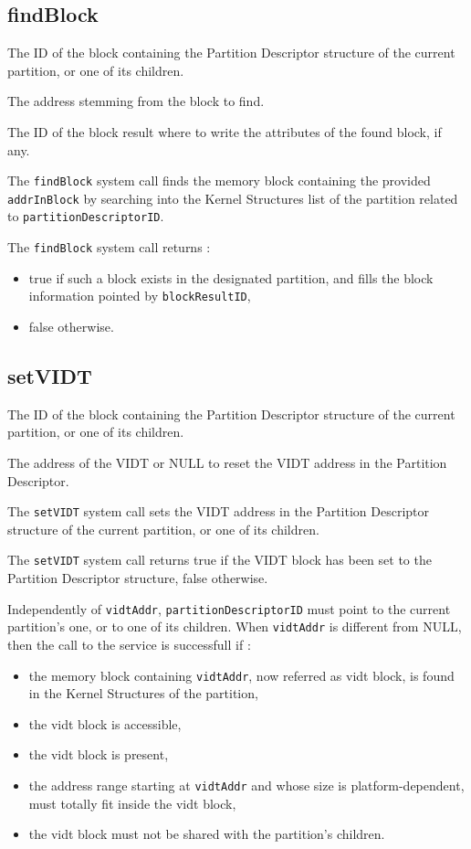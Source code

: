 \documentclass[10pt,a4paper,titlepage]{refart}
\begin{document}
\subsection{findBlock}
The ID of the block containing the Partition Descriptor structure of the current partition, or one of its children.

The address stemming from the block to find.

The ID of the block result where to write the attributes of the found block, if any.

\medskip
The \texttt{findBlock} system call finds the memory block containing the provided \texttt{addrInBlock} by
searching into the Kernel Structures list of the partition related to \texttt{partitionDescriptorID}.

The \texttt{findBlock} system call returns :
\begin{itemize}
    \item true if such a block exists in the designated partition, and fills the block information pointed by \texttt{blockResultID},
    \item false otherwise.
\end{itemize}

\subsection{setVIDT}
The ID of the block containing the Partition Descriptor structure of the current partition, or one of its children.

The address of the VIDT or NULL to reset the VIDT address in the Partition Descriptor.

\medskip
The \texttt{setVIDT} system call sets the VIDT address in the Partition Descriptor structure
of the current partition, or one of its children.

The \texttt{setVIDT} system call returns true if the VIDT block has been set to the Partition Descriptor structure, false otherwise.

Independently of \texttt{vidtAddr}, \texttt{partitionDescriptorID} must point to the current partition's one, or to one of its children.
When \texttt{vidtAddr} is different from NULL, then the call to the service is successfull if :
\begin{itemize}
    \item the memory block containing \texttt{vidtAddr}, now referred as vidt block, is found in the Kernel Structures of the partition,
    \item the vidt block is accessible,
    \item the vidt block is present,
    \item the address range starting at \texttt{vidtAddr} and whose size is platform-dependent, must totally fit inside the vidt block,
    \item the vidt block must not be shared with the partition's children.
\end{itemize}
\end{document}

